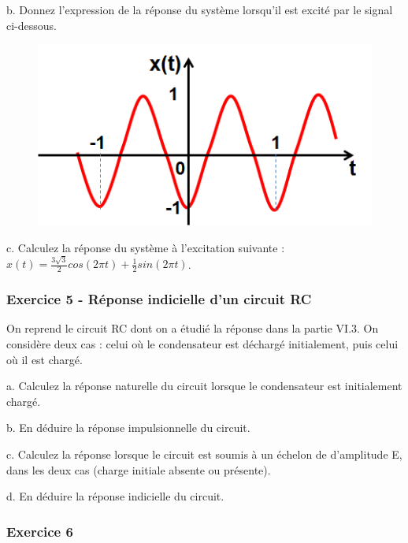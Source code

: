 	b. Donnez l'expression de la réponse du système lorsqu'il est
        excité par le signal ci-dessous.
	
	\begin{figure}[htbp]
          \centering \includegraphics[scale=0.5]{images/Exo_2_4.png}
	\end{figure}
	
	c. Calculez la réponse du système à l'excitation suivante : $x(t)=\frac{3\sqrt{3}}{2}cos(2\pi t)+\frac{1}{2}sin(2\pi t)$.\\
	
	
	
	\subsubsection{Exercice 5 - Réponse indicielle d'un circuit
          RC}
	
	On reprend le circuit RC dont on a étudié la réponse dans la
        partie VI.3. On considère deux cas : celui où le condensateur
        est déchargé initialement, puis celui où il est chargé.
	
	a. Calculez la réponse naturelle du circuit lorsque le
        condensateur est initialement chargé.
	
	b. En déduire la réponse impulsionnelle du circuit.
	
	c. Calculez la réponse lorsque le circuit est soumis à un
        échelon de \Heaviside{} d'amplitude E, dans les deux cas (charge
        initiale absente ou présente).
	
	d. En déduire la réponse indicielle du circuit.
	
	\vspace{1\baselineskip}
	

	
	\subsubsection{Exercice 6}
	
